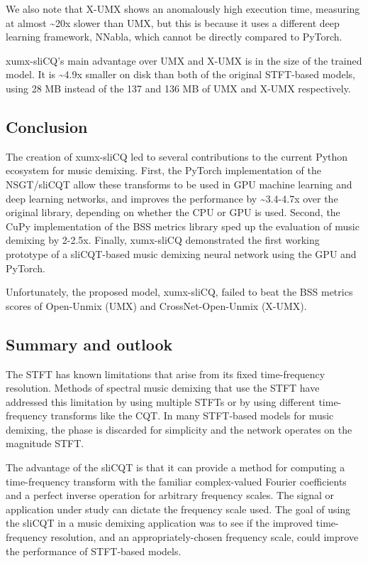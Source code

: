 \documentclass[report.tex]{subfiles}
\begin{document}
We also note that X-UMX shows an anomalously high execution time, measuring at almost \textasciitilde20x slower than UMX, but this is because it uses a different deep learning framework, NNabla, which cannot be directly compared to PyTorch.

xumx-sliCQ's main advantage over UMX and X-UMX is in the size of the trained model. It is \textasciitilde4.9x smaller on disk than both of the original STFT-based models, using 28 MB instead of the 137 and 136 MB of UMX and X-UMX respectively.

\subsection{Conclusion}
\label{sec:conclusion}

The creation of xumx-sliCQ led to several contributions to the current Python ecosystem for music demixing. First, the PyTorch implementation of the NSGT/sliCQT allow these transforms to be used in GPU machine learning and deep learning networks, and improves the performance by \textasciitilde3.4-4.7x over the original library, depending on whether the CPU or GPU is used. Second, the CuPy implementation of the BSS metrics library sped up the evaluation of music demixing by 2-2.5x. Finally, xumx-sliCQ demonstrated the first working prototype of a sliCQT-based music demixing neural network using the GPU and PyTorch.

Unfortunately, the proposed model, xumx-sliCQ, failed to beat the BSS metrics scores of Open-Unmix (UMX) and CrossNet-Open-Unmix (X-UMX).

\subsection{Summary and outlook}

The STFT has known limitations that arise from its fixed time-frequency resolution. Methods of spectral music demixing that use the STFT have addressed this limitation by using multiple STFTs or by using different time-frequency transforms like the CQT. In many STFT-based models for music demixing, the phase is discarded for simplicity and the network operates on the magnitude STFT.

The advantage of the sliCQT is that it can provide a method for computing a time-frequency transform with the familiar complex-valued Fourier coefficients and a perfect inverse operation for arbitrary frequency scales. The signal or application under study can dictate the frequency scale used. The goal of using the sliCQT in a music demixing application was to see if the improved time-frequency resolution, and an appropriately-chosen frequency scale, could improve the performance of STFT-based models.
\end{document}
